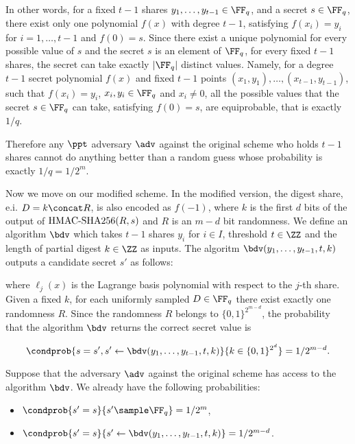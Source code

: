 \documentclass[envcountsame,runningheads,notitlepage]{llncs}
\begin{document}
	In other words, for a fixed $t-1$ shares $y_1, \ldots, y_{t-1} \in \FF_q$, and a secret $s \in \FF_q$, there exist only one polynomial $f(x)$ with degree $t-1$, satisfying $f(x_i) = y_i$ for $i = 1, \ldots, t-1$ and $f(0) = s$.
	Since there exist a unique polynomial for every possible value of $s$ and the secret $s$ is an element of $\FF_q$, for every fixed $t-1$ shares, the secret can take exactly $|\FF_q|$ distinct values. 
	Namely, for a  degree $t - 1$ secret polynomial $f(x)$ and fixed $t-1$ points $(x_1, y_1), \ldots, (x_{t-1}, y_{t-1})$, such that $f(x_i) = y_i$, $x_i, y_i \in \FF_q$ and $x_i \neq 0$, all the possible values that the secret $s \in \FF_q$ can take, satisfying $f(0) = s$, are equiprobable, that is exactly $1/q$.  
	 
	Therefore any $\ppt$ adversary $\adv$ against the original scheme who holds $t-1$ shares cannot do anything better than a random guess whose probability is exactly $1/q = 1/2^m$.
	
	Now we move on our modified scheme. 	
	In the modified version, the digest share, e.i. $D = k \concat R$, is also encoded as $f(-1)$, where  $k$ is the first $d$ bits of the output of ${\textrm{HMAC-SHA256}}(R, s)$ and $R$ is an $m - d$ bit randomness. 
	We define an algorithm $\bdv$ which takes $t-1$ shares $y_i$ for $i \in I$, threshold $t \in \ZZ$ and the length of partial digest $k \in \ZZ$ as inputs.
	The algoritm $\bdv(y_1, \ldots, y_{t-1}, t, k)$ outputs a candidate secret $s'$ as follows:
	
	where $\ell_{j}(x)$ is the  Lagrange basis polynomial with respect to the $j$-th share.
	Given a fixed $k$, for each uniformly sampled $D \in \FF_q$ there exist exactly one randomness $R$.  
	Since the randomness $R$ belongs to $\{0,1\}^{2^{m - d}}$, the probability that the algorithm $\bdv$ returns the correct secret value is 
	
	\begin{equation*}
		\condprob{s = s', s' \leftarrow \bdv(y_1, \ldots, y_{t-1}, t, k)}{k \in \{0,1\}^{2^{d}}} = 1/2^{m - d}.
	\end{equation*}
	
	Suppose that the adversary $\adv$ against the original scheme has access to the algorithm $\bdv$.
	We already have the following probabilities:
	\begin{itemize}
		\item $\condprob{s' = s}{s' \sample \FF_q} = 1/2^{m}$,
		\item $\condprob{s' = s}{s' \leftarrow \bdv(y_1, \ldots, y_{t-1}, t, k)} = 1/2^{m - d}$.
	\end{itemize}
	
\end{document}
